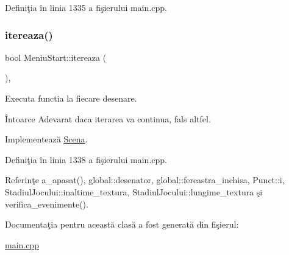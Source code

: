 Definiţia în linia 1335 a fişierului main.\+cpp.

\mbox{\label{classMeniuStart_a35a84c537eca90b76697d1bef88216e5}} 
\subsubsection{\texorpdfstring{itereaza()}{itereaza()}}
{\footnotesize\ttfamily bool Meniu\+Start\+::itereaza (\begin{DoxyParamCaption}\item[{\hyperlink{classStadiulJocului}{Stadiul\+Jocului} \&}]{ }\end{DoxyParamCaption})\hspace{0.3cm}{\ttfamily [override]}, {\ttfamily [virtual]}}



Executa functia la fiecare \textquotesingle{}desenare\textquotesingle{}. 

\begin{DoxyReturn}{Întoarce}
Adevarat daca iterarea va continua, fals altfel. 
\end{DoxyReturn}


Implementează \hyperlink{classScena_a9e5fcc831ed410b5b2422231ede746ee}{Scena}.



Definiţia în linia 1338 a fişierului main.\+cpp.



Referinţe a\+\_\+apasat(), global\+::desenator, global\+::fereastra\+\_\+inchisa, Punct\+::i, Stadiul\+Jocului\+::inaltime\+\_\+textura, Stadiul\+Jocului\+::lungime\+\_\+textura şi verifica\+\_\+evenimente().



Documentaţia pentru această clasă a fost generată din fişierul\+:\begin{DoxyCompactItemize}
\item 
\hyperlink{main_8cpp}{main.\+cpp}\end{DoxyCompactItemize}
